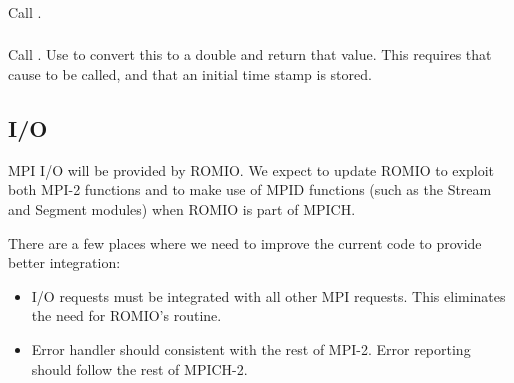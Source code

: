 \documentclass{article}
\begin{document}
\subsubsection{}
Call .

\subsubsection{}
Call .  Use  to convert this to
a double and return that value.
This requires that  cause  to be
called, and that an initial time stamp is stored.

\subsection{I/O}
MPI I/O will be provided by ROMIO.  We expect to update ROMIO to exploit both
MPI-2 functions and to make use of MPID functions (such as the Stream and
Segment modules) when ROMIO is part of MPICH.

There are a few places where we need to improve the current code to provide
better integration:
\begin{itemize}
\item I/O requests must be integrated with all other MPI requests.  This
  eliminates the need for ROMIO's  routine.
\item Error handler should consistent with the rest of MPI-2.  Error reporting
  should follow the rest of MPICH-2.
\end{itemize}
\end{document}
